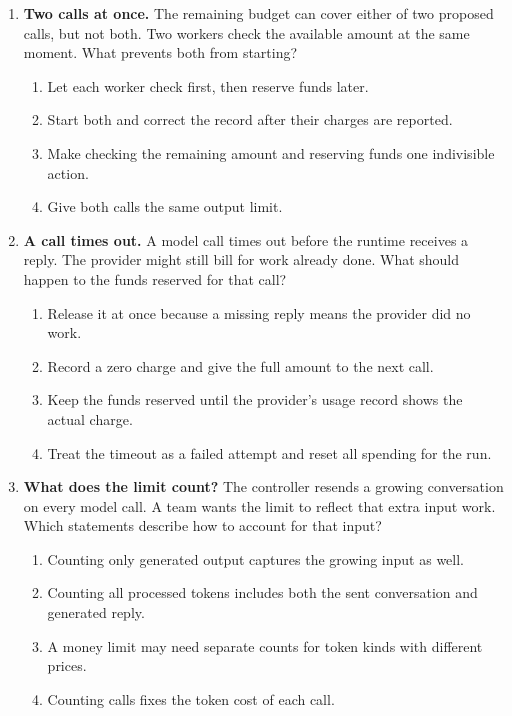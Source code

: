 \begin{enumerate}[start=51,itemsep=0.7\baselineskip]
\item\label{exercise:54} \begin{minipage}[t]{\linewidth}
\textbf{Two calls at once.} The remaining budget can cover either of two proposed calls, but not both. Two workers check the available amount at the same moment. What prevents both from starting?
\begin{enumerate}[label=\textnormal{(\Alph*)},leftmargin=*,itemsep=0pt]
\item Let each worker check first, then reserve funds later.
\item Start both and correct the record after their charges are reported.
\item Make checking the remaining amount and reserving funds one indivisible action.
\item Give both calls the same output limit.
\end{enumerate}
\end{minipage}

\item\label{exercise:55} \begin{minipage}[t]{\linewidth}
\textbf{A call times out.} A model call times out before the runtime receives a reply. The provider might still bill for work already done. What should happen to the funds reserved for that call?
\begin{enumerate}[label=\textnormal{(\Alph*)},leftmargin=*,itemsep=0pt]
\item Release it at once because a missing reply means the provider did no work.
\item Record a zero charge and give the full amount to the next call.
\item Keep the funds reserved until the provider's usage record shows the actual charge.
\item Treat the timeout as a failed attempt and reset all spending for the run.
\end{enumerate}
\end{minipage}

\item\label{exercise:56} \begin{minipage}[t]{\linewidth}
\textbf{What does the limit count?} The controller resends a growing conversation on every model call. A team wants the limit to reflect that extra input work. Which statements describe how to account for that input?
\begin{enumerate}[label=\textnormal{(\Alph*)},leftmargin=*,itemsep=0pt]
\item Counting only generated output captures the growing input as well.
\item Counting all processed tokens includes both the sent conversation and generated reply.
\item A money limit may need separate counts for token kinds with different prices.
\item Counting calls fixes the token cost of each call.
\end{enumerate}
\end{minipage}


\end{enumerate}
